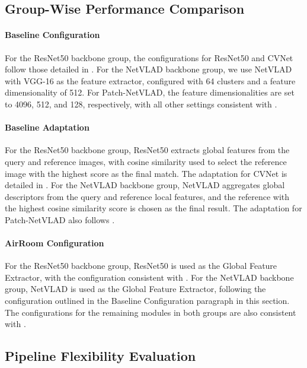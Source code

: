 \subsection{Group-Wise Performance Comparison}

\paragraph{Baseline Configuration} For the ResNet50 backbone group, the configurations for ResNet50 and CVNet follow those detailed in . For the NetVLAD backbone group, we use NetVLAD with VGG-16 as the feature extractor, configured with 64 clusters and a feature dimensionality of 512. For Patch-NetVLAD, the feature dimensionalities are set to 4096, 512, and 128, respectively, with all other settings consistent with .

\paragraph{Baseline Adaptation} For the ResNet50 backbone group, ResNet50 extracts global features from the query and reference images, with cosine similarity used to select the reference image with the highest score as the final match. The adaptation for CVNet is detailed in . For the NetVLAD backbone group, NetVLAD aggregates global descriptors from the query and reference local features, and the reference with the highest cosine similarity score is chosen as the final result. The adaptation for Patch-NetVLAD also follows .

\paragraph{AirRoom Configuration} For the ResNet50 backbone group, ResNet50 is used as the Global Feature Extractor, with the configuration consistent with . For the NetVLAD backbone group, NetVLAD is used as the Global Feature Extractor, following the configuration outlined in the Baseline Configuration paragraph in this section. The configurations for the remaining modules in both groups are also consistent with .

\subsection{Pipeline Flexibility Evaluation}

